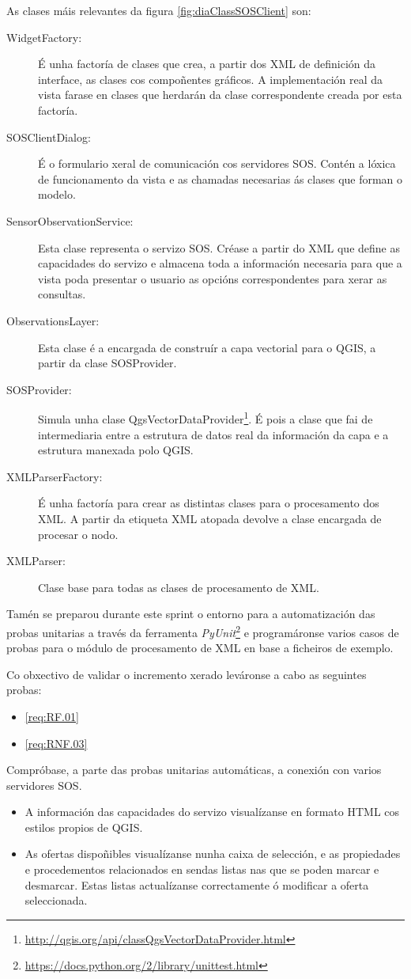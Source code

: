 As clases máis relevantes da figura \ref{fig:diaClassSOSClient} son:
\begin{description}
\item[WidgetFactory:] É unha factoría de clases que crea, a partir dos XML de definición da interface, as clases cos compoñentes gráficos. A implementación real da vista farase en clases que herdarán da clase correspondente creada por esta factoría.
\item[SOSClientDialog:] É o formulario xeral de comunicación cos servidores SOS. Contén a lóxica de funcionamento da vista e as chamadas necesarias ás clases que forman o modelo.
\item[SensorObservationService:] Esta clase representa o servizo SOS. Créase a partir do XML que define as capacidades do servizo e almacena toda a información necesaria para que a vista poda presentar o usuario as opcións correspondentes para xerar as consultas.
\item[ObservationsLayer:] Esta clase é a encargada de construír a capa vectorial para o QGIS, a partir da clase SOSProvider.
\item[SOSProvider:] Simula unha clase QgsVectorDataProvider\footnote{\url{http://qgis.org/api/classQgsVectorDataProvider.html}}. É pois a clase que fai de intermediaria entre a estrutura de datos real da información da capa e a estrutura manexada polo QGIS.
\item[XMLParserFactory:] É unha factoría para crear as distintas clases para o procesamento dos XML. A partir da etiqueta XML atopada devolve a clase encargada de procesar o nodo.
\item[XMLParser:] Clase base para todas as clases de procesamento de XML.
\end{description}

Tamén se preparou durante este sprint o entorno para a automatización das probas unitarias a través da ferramenta \emph{PyUnit}\footnote{\url{https://docs.python.org/2/library/unittest.html}} e programáronse varios casos de probas para o módulo de procesamento de XML en base a ficheiros de exemplo.

Co obxectivo de validar o incremento xerado leváronse a cabo as seguintes probas:
\newpage
{}
		  {\begin{itemize}\item \ref{req:RF.01} \item \ref{req:RNF.03}\end{itemize}} %
		  {Compróbase, a parte das probas unitarias automáticas, a conexión con varios servidores SOS.} %
		  {\begin{itemize}
		  \item A información das capacidades do servizo visualízanse en formato HTML cos estilos propios de QGIS.
		  \item As ofertas dispoñibles visualízanse nunha caixa de selección, e as propiedades e procedementos relacionados en sendas listas nas que se poden marcar e desmarcar. Estas listas actualízanse correctamente ó modificar a oferta seleccionada.
		  \end{itemize}} %
		  
